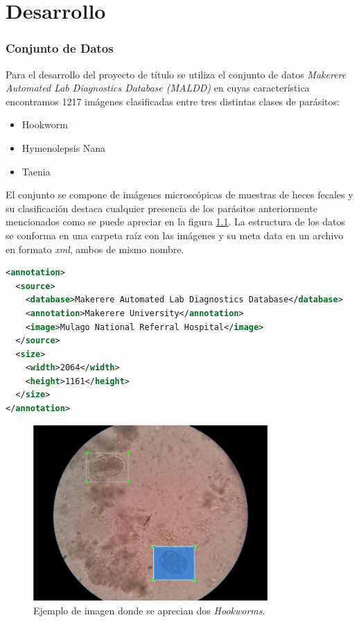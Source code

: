 \documentclass[letter,12pt]{report}
\begin{document}
\chapter{Desarrollo}
\subsection{Conjunto de Datos}
Para el desarrollo del proyecto de título se utiliza el conjunto de datos \textit{Makerere
Automated Lab Diagnostics Database (MALDD)} en cuyas característica encontramos 1217 imágenes 
clasificadas entre tres distintas clases de parásitos:

\begin{itemize}
    \item Hookworm
    \item Hymenolepsis Nana
    \item Taenia
\end{itemize}

El conjunto se compone de imágenes microscópicas de muestras de heces fecales y su
clasificación destaca cualquier presencia de los parásitos anteriormente mencionados
como se puede apreciar en la figura \ref{fig:labelImage}. La estructura de los datos se
conforma en una carpeta raíz con las imágenes y su meta data en un archivo en formato
\textit{xml}, ambos de mismo nombre.

\begin{lstlisting}[language=xml]
<annotation>
  <source>
    <database>Makerere Automated Lab Diagnostics Database</database>
    <annotation>Makerere University</annotation>
    <image>Mulago National Referral Hospital</image>
  </source>
  <size>
    <width>2064</width>
    <height>1161</height>
  </size>
</annotation>
\end{lstlisting}

\begin{figure}[ht]
    \centering
    \includegraphics[width=0.8\textwidth]{labelImage}
    \caption{Ejemplo de imagen donde se aprecian dos \textit{Hookworms}.}
    \label{fig:labelImage}
\end{figure}
\end{document}
